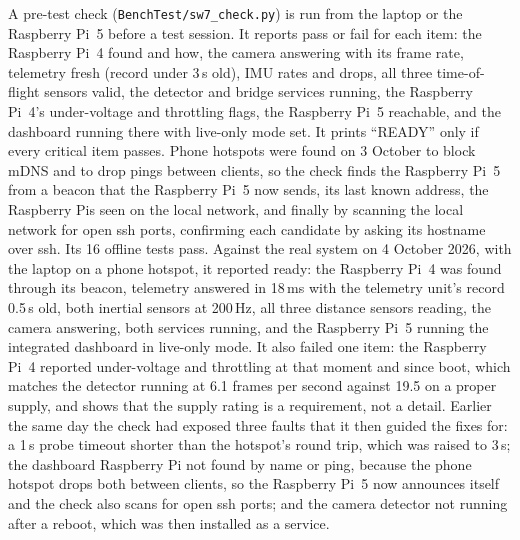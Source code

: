 A pre-test check (\texttt{BenchTest/sw7\_check.py}) is run from the laptop or the Raspberry Pi~5 before a test session. It reports pass or fail for each item: the Raspberry Pi~4 found and how, the camera answering with its frame rate, telemetry fresh (record under 3\,s old), IMU rates and drops, all three time-of-flight sensors valid, the detector and bridge services running, the Raspberry Pi~4's under-voltage and throttling flags, the Raspberry Pi~5 reachable, and the dashboard running there with live-only mode set. It prints ``READY'' only if every critical item passes. Phone hotspots were found on 3 October to block mDNS and to drop pings between clients, so the check finds the Raspberry Pi~5 from a beacon that the Raspberry Pi~5 now sends, its last known address, the Raspberry Pis seen on the local network, and finally by scanning the local network for open ssh ports, confirming each candidate by asking its hostname over ssh. Its 16 offline tests pass. Against the real system on 4 October 2026, with the laptop on a phone hotspot, it reported ready: the Raspberry Pi~4 was found through its beacon, telemetry answered in 18\,ms with the telemetry unit's record 0.5\,s old, both inertial sensors at 200\,Hz, all three distance sensors reading, the camera answering, both services running, and the Raspberry Pi~5 running the integrated dashboard in live-only mode. It also failed one item: the Raspberry Pi~4 reported under-voltage and throttling at that moment and since boot, which matches the detector running at 6.1 frames per second against 19.5 on a proper supply, and shows that the supply rating is a requirement, not a detail. Earlier the same day the check had exposed three faults that it then guided the fixes for: a 1\,s probe timeout shorter than the hotspot's round trip, which was raised to 3\,s; the dashboard Raspberry Pi not found by name or ping, because the phone hotspot drops both between clients, so the Raspberry Pi~5 now announces itself and the check also scans for open ssh ports; and the camera detector not running after a reboot, which was then installed as a service.

